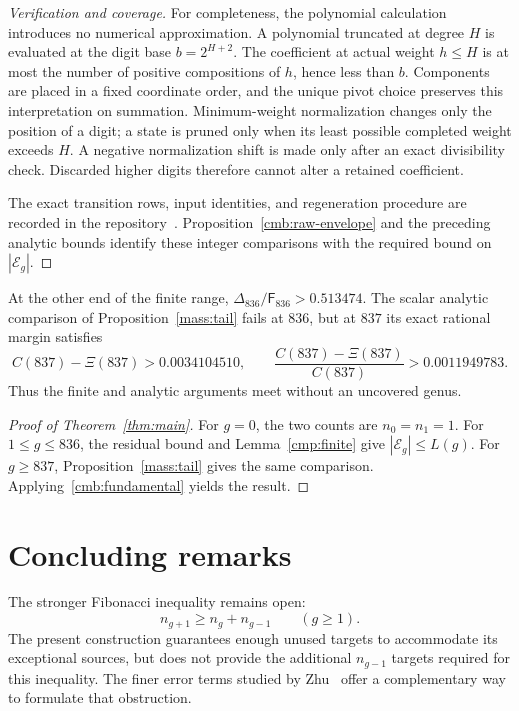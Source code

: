 \documentclass[11pt]{amsart}
\theoremstyle{definition}
\theoremstyle{remark}
\newcommand{\Fib}{\mathsf F}
\numberwithin{equation}{section}
\begin{document}
\begin{proof}[Verification and coverage]
For completeness, the polynomial calculation introduces no numerical
approximation. A polynomial truncated at degree $H$ is evaluated at the
digit base $b=2^{H+2}$. The coefficient at actual weight $h\le H$ is at most
the number of positive compositions of $h$, hence less than $b$. Components
are placed in a fixed coordinate order, and the unique pivot choice preserves
this interpretation on summation. Minimum-weight normalization changes only
the position of a digit; a state is pruned only when its least possible
completed weight exceeds $H$. A negative normalization shift is made only
after an exact divisibility check. Discarded higher digits therefore cannot
alter a retained coefficient.

The exact transition rows, input identities, and regeneration procedure are
recorded in the repository~\cite{LiuCompanion}. Proposition~\ref{cmb:raw-envelope}
and the preceding analytic bounds identify these integer comparisons
with the required bound on $|\mathcal E_g|$.
\end{proof}

At the other end of the finite range,
$\Delta_{836}/\Fib_{836}>0.513474$. The scalar analytic comparison of
Proposition~\ref{mass:tail} fails at $836$, but at $837$ its exact rational
margin satisfies
\[
 C(837)-\Xi(837)>0.0034104510,
 \qquad \frac{C(837)-\Xi(837)}{C(837)}>0.0011949783.
\]
Thus the finite and analytic arguments meet without an uncovered genus.

\begin{proof}[Proof of Theorem~\ref{thm:main}]
For $g=0$, the two counts are $n_0=n_1=1$.
For $1\le g\le836$, the residual bound and
Lemma~\ref{cmp:finite} give $|\mathcal E_g|\le L(g)$.
For $g\ge837$, Proposition~\ref{mass:tail} gives the same comparison.
Applying~\eqref{cmb:fundamental} yields the result.
\end{proof}

\section{Concluding remarks}

The stronger Fibonacci inequality remains open:
\[
 n_{g+1}\ge n_g+n_{g-1}\qquad(g\ge1).
\]
The present construction guarantees enough unused targets
to accommodate its exceptional sources, but does not provide the
additional $n_{g-1}$ targets required for this inequality. The finer
error terms studied by Zhu~\cite{Zhu} offer a complementary way to
formulate that obstruction.
\end{document}
